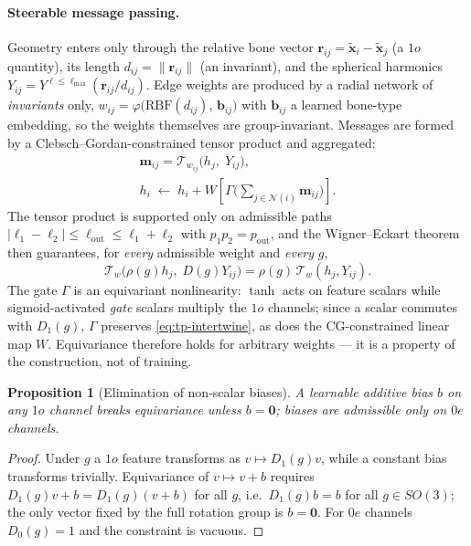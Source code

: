 \documentclass[10pt,journal]{IEEEtran}
\newtheorem{proposition}{Proposition}
\begin{document}
\paragraph{Steerable message passing.} Geometry enters only through the relative bone vector
$\bm{r}_{ij}=\tilde{\bm{x}}_i-\tilde{\bm{x}}_j$ (a $1o$ quantity), its length $d_{ij}=\|\bm{r}_{ij}\|$
(an invariant), and the spherical harmonics $Y_{ij}=Y^{\ell\le\ell_{\max}}(\bm{r}_{ij}/d_{ij})$. Edge
weights are produced by a radial network of \emph{invariants} only,
$w_{ij}=\varphi\big(\mathrm{RBF}(d_{ij}),\,\bm{b}_{ij}\big)$ with $\bm{b}_{ij}$ a learned bone-type
embedding, so the weights themselves are group-invariant. Messages are formed by a
Clebsch--Gordan-constrained tensor product and aggregated:
%
\begin{equation}
\label{eq:mp}
\begin{gathered}
\bm{m}_{ij}=\mathcal{T}_{w_{ij}}\big(h_j,\;Y_{ij}\big),\\[2pt]
h_i \;\leftarrow\; h_i + W\!\left[\Gamma\Big(\textstyle\sum_{j\in\mathcal{N}(i)}\bm{m}_{ij}\Big)\right].
\end{gathered}
\end{equation}
%
The tensor product is supported only on admissible paths
$|\ell_1-\ell_2|\le\ell_{\text{out}}\le\ell_1+\ell_2$ with $p_1p_2=p_{\text{out}}$, and the
Wigner--Eckart theorem then guarantees, for \emph{every} admissible weight and \emph{every} $g$,
%
\begin{equation}
\label{eq:tp-intertwine}
\mathcal{T}_{w}\big(\rho(g)h_j,\;D(g)Y_{ij}\big)=\rho(g)\,\mathcal{T}_{w}(h_j,Y_{ij}).
\end{equation}
%
The gate $\Gamma$ is an equivariant nonlinearity: $\tanh$ acts on feature scalars while
sigmoid-activated \emph{gate} scalars multiply the $1o$ channels; since a scalar commutes with
$D_1(g)$, $\Gamma$ preserves \eqref{eq:tp-intertwine}, as does the CG-constrained linear map $W$.
Equivariance therefore holds for arbitrary weights --- it is a property of the construction, not of
training.

\begin{proposition}[Elimination of non-scalar biases]
\label{prop:bias}
A learnable additive bias $b$ on any $1o$ channel breaks equivariance unless $b=\bm{0}$; biases are
admissible only on $0e$ channels.
\end{proposition}
\begin{proof}
Under $g$ a $1o$ feature transforms as $v\mapsto D_1(g)v$, while a constant bias transforms trivially.
Equivariance of $v\mapsto v+b$ requires $D_1(g)v+b=D_1(g)(v+b)$ for all $g$, i.e.\ $D_1(g)b=b$ for all
$g\in SO(3)$; the only vector fixed by the full rotation group is $b=\bm{0}$. For $0e$ channels
$D_0(g)=1$ and the constraint is vacuous.
\end{proof}
\end{document}
